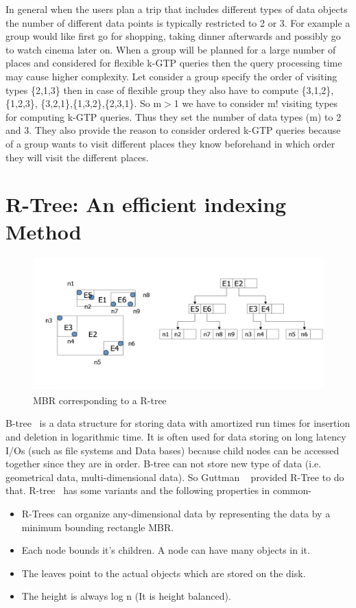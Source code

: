 In general when the users plan a trip that includes different types of data objects the number of different data points is typically restricted to 2 or 3. For example a group would like first go for shopping, taking dinner afterwards and possibly go to watch cinema later on. When a group will be planned for a large number of places   and considered for flexible k-GTP queries then the query processing time may cause higher complexity. Let consider a group specify the order of visiting types \{2,1,3\} then in case of flexible group they also have to compute \{3,1,2\},\{1,2,3\}, \{3,2,1\},\{1,3,2\},\{2,3,1\}. So m$>$1 we have to consider m! visiting types for computing k-GTP queries. Thus they set the number of data types (m) to 2 and 3. They also provide the reason to consider ordered k-GTP queries because of a group wants to visit different places they know beforehand in which order they will visit the different places.

\section{\label{sec:R}R-Tree: An efficient indexing Method}
\begin {figure}[htbp]
\centering
\includegraphics [width= 150mm]{figures/rtree.png}
\caption{MBR corresponding to a R-tree}
\label {overflow}
\end{figure}
B-tree~\cite{BTREE} is a data structure for storing data with amortized run times for insertion and deletion in logarithmic time. It is often used for data storing on long latency I/Os (such as file systems and Data bases) because child nodes can be accessed together since they are in order. B-tree can not store new type of data (i.e. geometrical data, multi-dimensional data). So Guttman ~\cite{RT2} provided R-Tree to do that. R-tree~\cite{RT3,RT4} has some variants and the following properties in common-
\begin{itemize}
\item  R-Trees can organize any-dimensional data by representing the data by a minimum bounding rectangle MBR.
\item Each node bounds it's children. A node can have many objects in it.
\item The leaves point to the actual objects which are stored on the disk.
\item The height is always log n (It is height balanced).

\end{itemize}


\endinput 